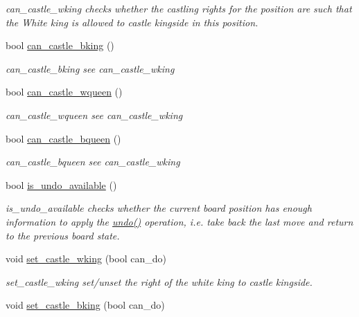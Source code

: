 \begin{DoxyCompactItemize}
\begin{DoxyCompactList}\small\item\em can\-\_\-castle\-\_\-wking checks whether the castling rights for the position are such that the White king is allowed to castle kingside in this position. \end{DoxyCompactList}\item 
bool \hyperlink{classchess_1_1Board_a2c840ad4473c74959ed396773b98e3b9}{can\-\_\-castle\-\_\-bking} ()
\begin{DoxyCompactList}\small\item\em can\-\_\-castle\-\_\-bking see can\-\_\-castle\-\_\-wking \end{DoxyCompactList}\item 
bool \hyperlink{classchess_1_1Board_ad233634a43bcaee9ef7490563e119500}{can\-\_\-castle\-\_\-wqueen} ()
\begin{DoxyCompactList}\small\item\em can\-\_\-castle\-\_\-wqueen see can\-\_\-castle\-\_\-wking \end{DoxyCompactList}\item 
bool \hyperlink{classchess_1_1Board_a08c869f01bdb5dbedbe1247a7ef6e081}{can\-\_\-castle\-\_\-bqueen} ()
\begin{DoxyCompactList}\small\item\em can\-\_\-castle\-\_\-bqueen see can\-\_\-castle\-\_\-wking \end{DoxyCompactList}\item 
bool \hyperlink{classchess_1_1Board_a0c19f4ee4fed148786b1215790f62a0e}{is\-\_\-undo\-\_\-available} ()
\begin{DoxyCompactList}\small\item\em is\-\_\-undo\-\_\-available checks whether the current board position has enough information to apply the \hyperlink{classchess_1_1Board_afbd72bf71259ba08016f6b547075d19b}{undo()} operation, i.\-e. take back the last move and return to the previous board state. \end{DoxyCompactList}\item 
void \hyperlink{classchess_1_1Board_af9caaf507db0ebca5530dfbeaa1de4d1}{set\-\_\-castle\-\_\-wking} (bool can\-\_\-do)
\begin{DoxyCompactList}\small\item\em set\-\_\-castle\-\_\-wking set/unset the right of the white king to castle kingside. \end{DoxyCompactList}\item 
void \hyperlink{classchess_1_1Board_a3b44c135a8d202fba74d0420bfbb1ece}{set\-\_\-castle\-\_\-bking} (bool can\-\_\-do)

\end{DoxyCompactItemize}
